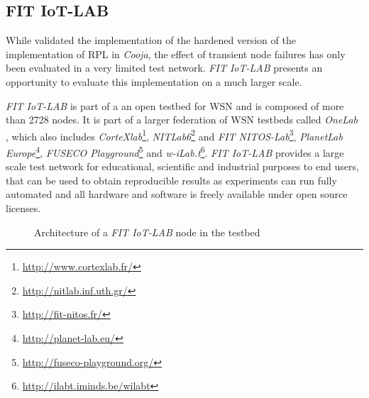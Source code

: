 \documentclass[
  a4paper,
  11pt,
  style=screen,
  extramargin,
  bcor=10mm,
  rgb,
  hyperrefdark,
  abstract=off,
  lnum,
]{tubsartcl}
\newcommand{\fitlab}{\emph{FIT IoT-LAB} }
\begin{document}
\subsection{FIT IoT-LAB}

While \cite{mueller2017} validated the implementation of the hardened version of the implementation of \ac{RPL} in \emph{Cooja}, the effect of transient node failures has only been evaluated in a very limited test network.
\fitlab presents an opportunity to evaluate this implementation on a much larger scale.

\fitlab \cite{adjih2015fit} is part of a an open testbed for \ac{WSN} and is composed of more than 2728 nodes.
It is part of a larger federation of \ac{WSN} testbeds called \emph{OneLab} \cite{baron2015onelab}, which also includes \emph{CorteXlab}\footnote{\url{http://www.cortexlab.fr/}}, \emph{NITLab6}\footnote{\url{ http://nitlab.inf.uth.gr/}} and \emph{FIT NITOS-Lab}\footnote{\url{http://fit-nitos.fr/}}, \emph{PlanetLab Europe}\footnote{\url{http://planet-lab.eu/}}, \emph{FUSECO Playground}\footnote{\url{http://fuseco-playground.org/}} and \emph{w-iLab.t}\footnote{\url{http://ilabt.iminds.be/wilabt}}.
\fitlab provides a large scale test network for educational, scientific and industrial purposes to end users, that can be used to obtain reproducible results as experiments can run fully automated and all hardware and software is freely available under open source licenses.

\begin{figure}[h]
  \centering
  \caption{Architecture of a \fitlab node in the testbed}
  \label{fig:fitnode}
\end{figure}
\end{document}
